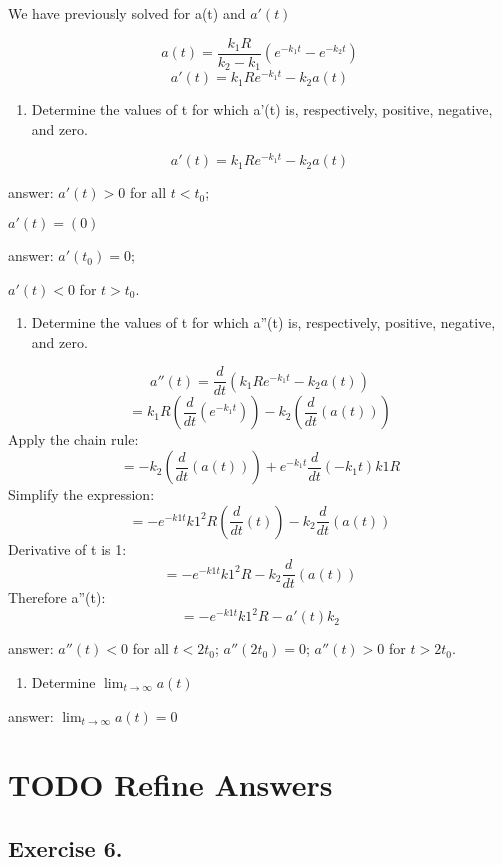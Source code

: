 \documentclass[]{article}
\providecommand{\tightlist}{%
  \setlength{\itemsep}{0pt}\setlength{\parskip}{0pt}}
\begin{document}
We have previously solved for a(t) and \(a'(t)\)

\[a(t) = \frac{k_1 R}{k_2-k_1}(e^{-k_1t} - e^{-k_2t})\]
\[a'(t) = k_1Re^{-k_1t}-k_2a(t)\]

\begin{enumerate}
\def\labelenumi{(\alph{enumi})}
\tightlist
\item
  Determine the values of t for which a'(t) is, respectively, positive,
  negative, and zero.
\end{enumerate}

\[a'(t) =k_1Re^{-k_1t}-k_2a(t)\]

answer: \(a'(t) > 0\) for all \(t < t_0\);

\(a'(t) = (0)\)

answer: \(a'(t_0) = 0\);

\(a'(t) < 0\) for \(t > t_0\).

\begin{enumerate}
\def\labelenumi{(\alph{enumi})}
\setcounter{enumi}{1}
\tightlist
\item
  Determine the values of t for which a''(t) is, respectively, positive,
  negative, and zero.
\end{enumerate}

\[a''(t) = \frac{d}{dt}(k_1Re^{-k_1t}-k_2a(t))\]
\[=k_1 R(\frac{d}{dt}(e^{-k_1 t}))- k_2 (\frac{d}{dt}(a(t)))\] Apply the
chain rule:
\[=- k_2 (\frac{d}{dt}(a(t)))+ e^{-k_1 t}\frac{d}{dt}({-k_1 t})k1 R\]
Simplify the expression:
\[=-e^{-k1 t}k1^2 R(\frac{d}{dt}(t)) -k_2 \frac{d}{dt}({a(t)})\]
Derivative of t is 1: \[=-e^{-k1 t}k1^2 R-k_2 \frac{d}{dt}({a(t)})\]
Therefore a''(t): \[=-e^{-k1 t}k1^2 R-a'(t)k_2\]

answer: \(a''(t) < 0\) for all \(t < 2t_0\); \(a''(2t_0) =0\);
\(a''(t) > 0\) for \(t > 2t_0\).

\begin{enumerate}
\def\labelenumi{(\alph{enumi})}
\setcounter{enumi}{2}
\tightlist
\item
  Determine \(\lim_{t\to\infty}a(t)\)
\end{enumerate}

answer: \(\lim_{t\to\infty}a(t) =0\)

\section{TODO Refine Answers}\label{todo-refine-answers}

\subsection{Exercise 6.}\label{exercise-6.}
\end{document}
